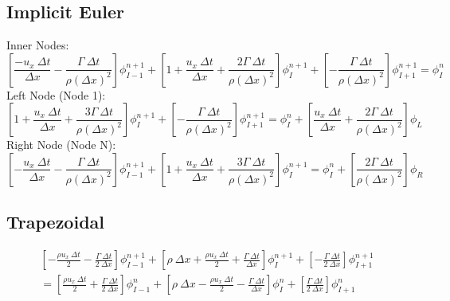 \documentclass[12pt]{article}
\begin{document}
\subsection{Implicit Euler}
Inner Nodes:
\begin{equation}
    \left[ \frac{-u_x\: \Delta t}{\Delta x} - \frac{\Gamma\:\Delta t}{\rho\left(\Delta x\right)^2} \right]\phi_{I-1}^{n+1} + \left[ 1 + \frac{u_x\: \Delta t}{\Delta x} + \frac{2\Gamma\: \Delta t}{\rho\left(\Delta x\right)^2} \right]\phi_{I}^{n+1} + \left[ -\frac{\Gamma\: \Delta t}{\rho\left(\Delta x\right)^2} \right]\phi_{I+1}^{n+1} = \phi_{I}^{n}
    \label{eq:ie inner}
\end{equation}
Left Node (Node 1):
\begin{equation}
    \left[ 1 + \frac{u_x\:\Delta t}{\Delta x} + \frac{3\Gamma\:\Delta t}{\rho\left(\Delta x\right)^2} \right]\phi_{I}^{n+1} + \left[ -\frac{\Gamma\:\Delta t}{\rho\left(\Delta x\right)^2} \right]\phi_{I+1}^{n+1} = \phi_{I}^{n} + \left[ \frac{u_x\:\Delta t}{\Delta x} + \frac{2\Gamma\:\Delta t}{\rho\left(\Delta x\right)^2} \right]\phi_{L}
    \label{eq:ie left}
\end{equation}
Right Node (Node N):
\begin{equation}
    \left[ -\frac{u_x\:\Delta t}{\Delta x} - \frac{\Gamma\:\Delta t}{\rho\left(\Delta x\right)^2} \right]\phi_{I-1}^{n+1} + \left[ 1 + \frac{u_x\:\Delta t}{\Delta x} + \frac{3\Gamma\:\Delta t}{\rho\left(\Delta x\right)^2} \right]\phi_{I}^{n+1} = \phi_{I}^{n} + \left[ \frac{2\Gamma\:\Delta t}{\rho\left(\Delta x\right)^2} \right]\phi_{R}
    \label{eq:ie right}
\end{equation}


\subsection{Trapezoidal}
\begin{multline*}
    \left[ -\frac{\rho u_x\: \Delta t}{2} - \frac{\Gamma\: \Delta t}{2\: \Delta x} \right]\phi_{I-1}^{n+1} + \left[ \rho \:\Delta x + \frac{\rho u_x\: \Delta t}{2} + \frac{\Gamma\: \Delta t}{\Delta x} \right]\phi_{I}^{n+1} + \left[ -\frac{\Gamma\: \Delta t}{2\: \Delta x} \right]\phi_{I+1}^{n+1}\\
    = \left[ \frac{\rho u_x\: \Delta t}{2} + \frac{\Gamma\: \Delta t}{2\: \Delta x} \right]\phi_{I-1}^{n} + \left[ \rho \:\Delta x - \frac{\rho u_x\: \Delta t}{2} - \frac{\Gamma\: \Delta t}{\Delta x} \right]\phi_{I}^{n} + \left[ \frac{\Gamma\: \Delta t}{2\: \Delta x} \right]\phi_{I+1}^{n}
\end{multline*}
\end{document}
